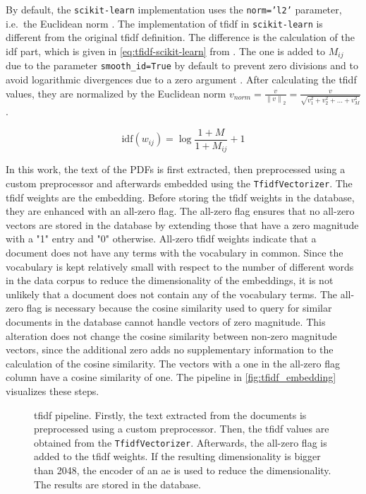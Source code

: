 By default, the \texttt{scikit-learn} implementation uses the \texttt{norm='l2'} parameter, i.e.\ the Euclidean norm \cite{tfidf-scikit-learn}.
The implementation of \ac{tfidf} in \texttt{scikit-learn} is different from the original \ac{tfidf} definition.
The difference is the calculation of the \ac{idf} part, which is given in \autoref{eq:tfidf-scikit-learn} from \cite{tfidf-scikit-learn}.
The one is added to $M_{ij}$ due to the parameter \texttt{smooth\_id=True} by default to prevent zero divisions \cite{tfidf-scikit-learn}
and to avoid logarithmic divergences due to a zero argument \cite{glove2014}.
After calculating the \ac{tfidf} values, they are normalized by the Euclidean norm 
$v_{norm} = \frac{v}{\left\| v \right\|_{2}} = \frac{v}{\sqrt{v_1^{2} + v_2^{2} + ... + v_M^{2}}}$.

\begin{equation}
    \text{idf}(w_{ij}) = \log \frac{1 + M}{1 + M_{ij}} + 1    
    \label{eq:tfidf-scikit-learn}
\end{equation}

In this work, the text of the PDFs is first extracted, then preprocessed using a custom preprocessor and afterwards embedded using the \texttt{TfidfVectorizer}.
The \ac{tfidf} weights are the embedding.
Before storing the \ac{tfidf} weights in the database, they are enhanced with an all-zero flag.
The all-zero flag ensures that no all-zero vectors are stored in the database by extending those that have a zero magnitude with a "1" entry and "0" otherwise.
All-zero \ac{tfidf} weights indicate that a document does not have any terms with the vocabulary in common.
Since the vocabulary is kept relatively small with respect to the number of different words in the data corpus to reduce the dimensionality of the embeddings, 
it is not unlikely that a document does not contain any of the vocabulary terms.
The all-zero flag is necessary because the cosine similarity used to query for similar documents in the database cannot handle vectors of zero magnitude.
This alteration does not change the cosine similarity between non-zero magnitude vectors, 
since the additional zero adds no supplementary information to the calculation of the cosine similarity.
The vectors with a one in the all-zero flag column have a cosine similarity of one.
The pipeline in \autoref{fig:tfidf_embedding} visualizes these steps.

\begin{figure}[!htb] %
    \centering
    
    \caption[\ac{tfidf} pipeline]{\ac{tfidf} pipeline.
    Firstly, the text extracted from the documents is preprocessed using a custom preprocessor.
    Then, the \ac{tfidf} values are obtained from the \texttt{TfidfVectorizer}.
    Afterwards, the all-zero flag is added to the \ac{tfidf} weights.
    If the resulting dimensionality is bigger than 2048, the encoder of an \ac{ae} is used to reduce the dimensionality.
    The results are stored in the database.
    }
    \label{fig:tfidf_embedding}
\end{figure}


